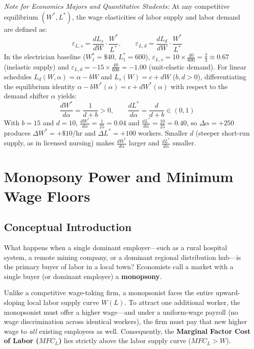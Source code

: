 \documentclass[11pt,letterpaper]{article}
\begin{document}
\begin{tcolorbox}[colback=SlateBlue!5!white,colframe=SlateBlue!85!black,title=\textbf{Optional Advanced Section: Wage Elasticities and Comparative Statics}]
\small
\emph{Note for Economics Majors and Quantitative Students:}
At any competitive equilibrium $(W^*, L^*)$, the wage elasticities of labor supply and labor demand are defined as:
\[
\varepsilon_{L,s} = \frac{dL_s}{dW}\cdot\frac{W^*}{L^*}, \qquad \varepsilon_{L,d} = \frac{dL_d}{dW}\cdot\frac{W^*}{L^*}
\]
In the electrician baseline ($W_1^* = \$40$, $L_1^* = 600$), $\varepsilon_{L,s} = 10 \times \frac{40}{600} = \frac{2}{3} \approx 0.67$ (inelastic supply) and $\varepsilon_{L,d} = -15 \times \frac{40}{600} = -1.00$ (unit-elastic demand). For linear schedules $L_d(W,\alpha) = \alpha - bW$ and $L_s(W) = c + dW$ ($b,d > 0$), differentiating the equilibrium identity $\alpha - bW^*(\alpha) = c + dW^*(\alpha)$ with respect to the demand shifter $\alpha$ yields:
\[
\frac{dW^*}{d\alpha} = \frac{1}{d + b} > 0, \qquad \frac{dL^*}{d\alpha} = \frac{d}{d + b} \in (0, 1)
\]
With $b = 15$ and $d = 10$, $\frac{dW^*}{d\alpha} = \frac{1}{25} = 0.04$ and $\frac{dL^*}{d\alpha} = \frac{10}{25} = 0.40$, so $\Delta\alpha = +250$ produces $\Delta W^* = +\$10/\text{hr}$ and $\Delta L^* = +100$ workers. Smaller $d$ (steeper short-run supply, as in licensed nursing) makes $\frac{dW^*}{d\alpha}$ larger and $\frac{dL^*}{d\alpha}$ smaller.
\end{tcolorbox}

\section{Monopsony Power and Minimum Wage Floors}

\subsection*{Conceptual Introduction}
What happens when a single dominant employer---such as a rural hospital system, a remote mining company, or a dominant regional distribution hub---is the primary buyer of labor in a local town? Economists call a market with a single buyer (or dominant employer) a \textbf{monopsony}.

Unlike a competitive wage-taking firm, a monopsonist faces the entire upward-sloping local labor supply curve $W(L)$. To attract one additional worker, the monopsonist must offer a higher wage---and under a uniform-wage payroll (no wage discrimination across identical workers), the firm must pay that new higher wage to \emph{all} existing employees as well. Consequently, the \textbf{Marginal Factor Cost of Labor ($MFC_L$)} lies strictly above the labor supply curve ($MFC_L > W$).
\end{document}
